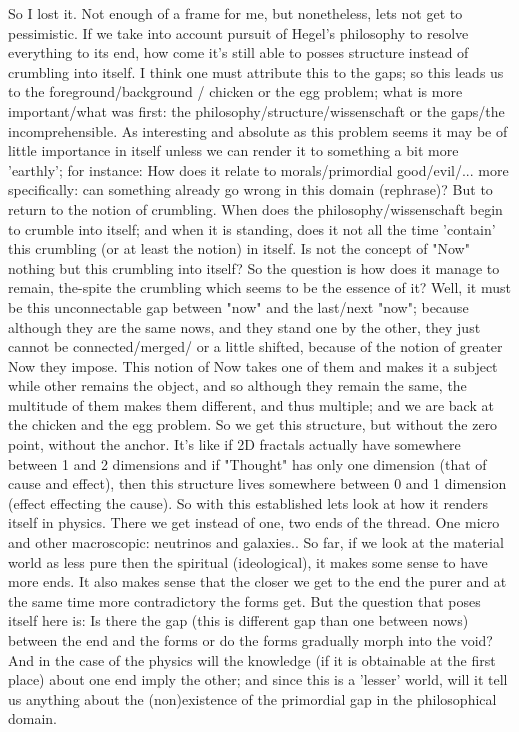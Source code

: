 \documentclass[10pt]{book}
\begin{document}
So I lost it. Not enough of a frame for me, but nonetheless, lets not get to pessimistic. If we take into account pursuit of Hegel's philosophy to resolve everything to its end, how come it's still able to posses structure instead of crumbling into itself. I think one must attribute this to the gaps; so this leads us to the foreground/background / chicken or the egg problem; what is more important/what was first: the philosophy/structure/wissenschaft or the gaps/the incomprehensible.
As interesting and absolute as this problem seems it may be of little importance in itself unless we can render it to something a bit more 'earthly'; for instance: How does it relate to morals/primordial good/evil/... more specifically: can something already go wrong in this domain (rephrase)?
But to return to the notion of crumbling. When does the philosophy/wissenschaft begin to crumble into itself; and when it is standing, does it not all the time 'contain' this crumbling (or at least the notion) in itself. Is not the concept of "Now" nothing but this crumbling into itself? So the question is how does it manage to remain, the-spite the crumbling which seems to be the essence of it? Well, it must be this unconnectable gap between "now" and the last/next "now"; because although they are the same nows, and they stand one by the other, they just cannot be connected/merged/ or a little shifted, because of the notion of greater Now they impose. This notion of Now takes one of them and makes it a subject while other remains the object, and so although they remain the same, the multitude of them makes them different, and thus multiple; and we are back at the chicken and the egg problem. So we get this structure, but without the zero point, without the anchor. It's like if 2D fractals actually have somewhere between 1 and 2 dimensions and if "Thought" has only one dimension (that of cause and effect), then this structure lives somewhere between 0 and 1 dimension (effect effecting the cause). 
So with this established lets look at how it renders itself in physics. There we get instead of one, two ends of the thread. One micro and other macroscopic: neutrinos and galaxies.. So far, if we look at the material world as less pure then the spiritual (ideological), it makes some sense to have more ends. It also makes sense that the closer we get to the end the purer and at the same time more contradictory the forms get. But the question that poses itself here is: Is there the gap (this is different gap than one between nows) between the end and the forms or do the forms gradually morph into the void? And in the case of the physics will the knowledge (if it is obtainable at the first place) about one end imply the other; and since this is a 'lesser' world, will it tell us anything about the (non)existence of the primordial gap in the philosophical domain.
\end{document}
